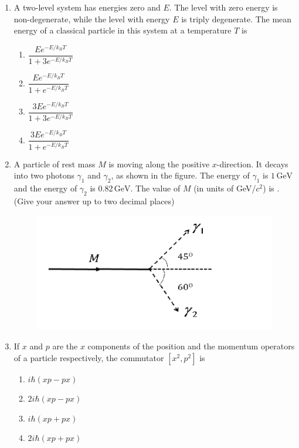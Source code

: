 \documentclass[journal,12pt,onecolumn]{IEEEtran}
\theoremstyle{remark}
\begin{document}
\begin{enumerate}
    \item A two-level system has energies zero and $E$. The level with zero energy is non-degenerate, while the level with energy $E$ is triply degenerate. The mean energy of a classical particle in this system at a temperature $T$ is
    \begin{multicols}{2}
    \begin{enumerate}
        \item $\dfrac{E e^{-E/k_B T}}{1 + 3 e^{-E/k_B T}}$
        \item $\dfrac{E e^{-E/k_B T}}{1 + e^{-E/k_B T}}$
        \item $\dfrac{3 E e^{-E/k_B T}}{1 + 3 e^{-E/k_B T}}$
        \item $\dfrac{3 E e^{-E/k_B T}}{1 + e^{-E/k_B T}}$
    \end{enumerate}
    \end{multicols}
    
    \item A particle of rest mass $M$ is moving along the positive $x$-direction. It decays into two photons $\gamma_1$ and $\gamma_2$, as shown in the figure. The energy of $\gamma_1$ is $1\,\text{GeV}$ and the energy of $\gamma_2$ is $0.82\,\text{GeV}$. The value of $M$ (in units of GeV/$c^2$) is \underline{\hspace{2cm}}. (Give your answer up to two decimal places)
   \begin{figure}[H]
    \centering
    \includegraphics[width = 0.5\columnwidth]{fig/Q47.png}
    \caption*{}
    \label{fig:Q47}
\end{figure}
    \item If $x$ and $p$ are the $x$ components of the position and the momentum operators of a particle respectively, the commutator $[x^2, p^2]$ is
    \begin{enumerate}
        \item $i\hbar (xp - px)$
        \item $2i\hbar (xp - px)$
        \item $i\hbar (xp + px)$
        \item $2i\hbar (xp + px)$
    \end{enumerate}
    

\end{enumerate}
\end{document}

